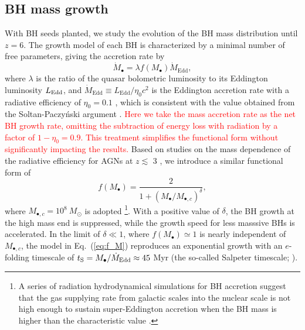 \documentclass[twocolumn, twocolappendix]{aastex63}
\newcommand{\Msun}{M_\odot}
\newcommand{\Mbh}{M_\bullet}
\newcommand{\Mdot}{\dot{M}}
\newcommand{\red}[1]{\textcolor{red}{ #1}}
\begin{document}
\begin{CJK*}{UTF8}{gbsn}
\vspace{2mm}
\subsection{BH mass growth}
\label{sec:model}
With BH seeds planted, we study the evolution of the BH mass distribution until $z=6$. 
The growth model of each BH is characterized by a minimal number of free parameters, 
giving the accretion rate by
%
\begin{equation}
  \label{eq:mdot}
  \Mdot_\bullet = \lambda f(\Mbh) \Mdot_\mathrm{Edd} ,
\end{equation}
where $\lambda$ is the ratio of the quasar bolometric luminosity to its Eddington luminosity $L_{\rm Edd}$,
and $\Mdot_\mathrm{Edd} \equiv L_{\mathrm{Edd}}/\eta_0 c^2$ is the Eddington accretion rate with a radiative efficiency of $\eta_0=0.1$ \citep{1973A&A....24..337S},
which is consistent with the value obtained from the Soltan-Paczy{\'n}ski argument \citep[e.g.,][]{2002MNRAS.335..965Y,2010ApJ...725..388C}.
\red{
Here we take the mass accretion rate as the net BH growth rate,
omitting the subtraction of energy loss with radiation by a factor of $1-\eta_0=0.9$.
This treatment simplifies the functional form without significantly impacting the results.
}
Based on studies on the mass dependence of the radiative efficiency for AGNs at $z\lesssim$ 3 
\citep{2008MNRAS.390..561C,2012ApJ...749..187L,2014ApJ...786..104U}, 
we introduce a similar functional form of
%
\begin{equation}
\label{eq:f_M}
f(\Mbh) = \frac{2}{1+\left(\Mbh /M_{\bullet,c} \right)^\delta}, 
\end{equation}
%
where $M_{\bullet,c}=10^8~\Msun$ is adopted
\footnote[3]{
A series of radiation hydrodynamical simulations for BH accretion
suggest that the gas supplying rate from galactic scales into the nuclear scale is not high enough to sustain 
super-Eddington accretion when the BH mass is higher than the characteristic value \citep{2021ApJ...907...74T}.}.
With a positive value of $\delta$, the BH growth at the high mass end is suppressed,
while the growth speed for less masssive BHs is accelerated.
In the limit of $\delta \ll 1$, where $f(\Mbh) \simeq 1$ is nearly independent of $M_{\bullet,c}$,
the model in Eq.~(\ref{eq:f_M}) reproduces an exponential growth with an $e$-folding timescale of
$t_{\rm S} =  \Mbh/\Mdot_{\mathrm{Edd}} \approx 45$ Myr (the so-called Salpeter timescale; \citealt{1964ApJ...140..796S}).




\end{CJK*}
\end{document}
